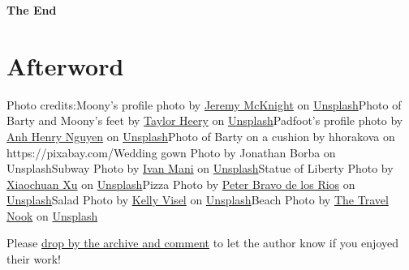 \documentclass[12pt,twoside,openright]{memoir}
\begin{document}
\textbf{The End} \chapter{Afterword}

Photo credits:\newline Moony's profile photo by
\href{https://unsplash.com/@jeremymcknight?utm_source=unsplash&utm_medium=referral&utm_content=creditCopyText}{Jeremy McKnight} on
\href{https://unsplash.com/@jeremymcknight?utm_source=unsplash&utm_medium=referral&utm_content=creditCopyText}{Unsplash}\newline Photo of Barty and Moony's feet by
\href{https://unsplash.com/@taylorheeryphoto?utm_source=unsplash&utm_medium=referral&utm_content=creditCopyText}{Taylor Heery} on
\href{https://unsplash.com/?utm_source=unsplash&utm_medium=referral&utm_content=creditCopyText}{Unsplash}\newline Padfoot's profile photo by
\href{https://unsplash.com/@thefalsehenry?utm_source=unsplash&utm_medium=referral&utm_content=creditCopyText}{Anh Henry Nguyen} on
\href{https://unsplash.com/@thefalsehenry?utm_source=unsplash&utm_medium=referral&utm_content=creditCopyText}{Unsplash}\newline Photo of Barty on a cushion by hhorakova on https://pixabay.com/\newline Wedding gown Photo by Jonathan Borba on Unsplash\newline Subway Photo by
\href{https://unsplash.com/@ivans_in_danger?utm_source=unsplash&utm_medium=referral&utm_content=creditCopyText}{Ivan Mani} on
\href{https://unsplash.com/?utm_source=unsplash&utm_medium=referral&utm_content=creditCopyText}{Unsplash}\newline Statue of Liberty Photo by
\href{https://unsplash.com/@uchikakashi?utm_source=unsplash&utm_medium=referral&utm_content=creditCopyText}{Xiaochuan Xu} on
\href{https://unsplash.com/?utm_source=unsplash&utm_medium=referral&utm_content=creditCopyText}{Unsplash}\newline Pizza Photo by
\href{https://unsplash.com/es/@studio754?utm_source=unsplash&utm_medium=referral&utm_content=creditCopyText}{Peter Bravo de los Rios} on
\href{https://unsplash.com/?utm_source=unsplash&utm_medium=referral&utm_content=creditCopyText}{Unsplash}\newline Salad Photo by
\href{https://unsplash.com/@kellyvisel?utm_source=unsplash&utm_medium=referral&utm_content=creditCopyText}{Kelly Visel}
on \href{https://unsplash.com/?utm_source=unsplash&utm_medium=referral&utm_content=creditCopyText}{Unsplash}\newline Beach Photo by
\href{https://unsplash.com/@thetravelnook?utm_source=unsplash&utm_medium=referral&utm_content=creditCopyText}{The Travel Nook} on
\href{https://unsplash.com/s/photos/beach?utm_source=unsplash&utm_medium=referral&utm_content=creditCopyText}{Unsplash}
{\centering Please \href{http://archiveofourown.org/works/39624996/comments/new}{drop by the archive and comment} to let the author know if you enjoyed their work!
\par}
\end{document}
